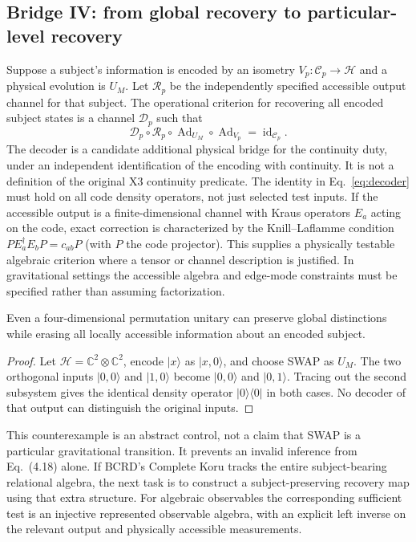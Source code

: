 \documentclass[11pt,a4paper]{article}
\begin{document}
\subsection{Bridge IV: from global recovery to particular-level recovery}
Suppose a subject's information is encoded by an isometry $V_p:\mathcal C_p\to\mathcal H$ and a physical evolution is $U_M$. Let $\mathcal R_p$ be the independently specified accessible output channel for that subject. The operational criterion for recovering all encoded subject states is a channel $\mathcal D_p$ such that
\begin{equation}\mathcal D_p\circ\mathcal R_p\circ\operatorname{Ad}_{U_M}\circ\operatorname{Ad}_{V_p}=\operatorname{id}_{\mathcal C_p}.\label{eq:decoder}\end{equation}
The decoder is a candidate additional physical bridge for the continuity duty, under an independent identification of the encoding with continuity. It is not a definition of the original X3 continuity predicate. The identity in Eq.~\eqref{eq:decoder} must hold on all code density operators, not just selected test inputs. If the accessible output is a finite-dimensional channel with Kraus operators $E_a$ acting on the code, exact correction is characterized by the Knill--Laflamme condition \cite{kl} $P E_a^\dagger E_b P=c_{ab}P$ (with $P$ the code projector). This supplies a physically testable algebraic criterion where a tensor or channel description is justified. In gravitational settings the accessible algebra and edge-mode constraints must be specified rather than assuming factorization.

\begin{proposition}\label{prop:swap}
Even a four-dimensional permutation unitary can preserve global distinctions while erasing all locally accessible information about an encoded subject.
\end{proposition}
\begin{proof} Let $\mathcal H=\mathbb C^2\otimes\mathbb C^2$, encode $|x\rangle$ as $|x,0\rangle$, and choose SWAP as $U_M$. The two orthogonal inputs $|0,0\rangle$ and $|1,0\rangle$ become $|0,0\rangle$ and $|0,1\rangle$. Tracing out the second subsystem gives the identical density operator $|0\rangle\langle0|$ in both cases. No decoder of that output can distinguish the original inputs.\end{proof}
This counterexample is an abstract control, not a claim that SWAP is a particular gravitational transition. It prevents an invalid inference from Eq.~(4.18) alone. If BCRD's Complete Koru tracks the entire subject-bearing relational algebra, the next task is to construct a subject-preserving recovery map using that extra structure. For algebraic observables the corresponding sufficient test is an injective represented observable algebra, with an explicit left inverse on the relevant output and physically accessible measurements.
\end{document}
